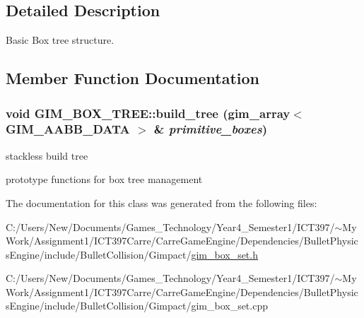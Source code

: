 \subsection{Detailed Description}
Basic Box tree structure. 

\subsection{Member Function Documentation}
\hypertarget{class_g_i_m___b_o_x___t_r_e_e_f76fa1d2f5e20c8979120fa72cf7575f}{
\subsubsection[build\_\-tree]{\setlength{\rightskip}{0pt plus 5cm}void GIM\_\-BOX\_\-TREE::build\_\-tree ({\bf gim\_\-array}$<$ GIM\_\-AABB\_\-DATA $>$ \& {\em primitive\_\-boxes})}}
\label{class_g_i_m___b_o_x___t_r_e_e_f76fa1d2f5e20c8979120fa72cf7575f}


stackless build tree 

prototype functions for box tree management 

The documentation for this class was generated from the following files:\begin{CompactItemize}
\item 
C:/Users/New/Documents/Games\_\-Technology/Year4\_\-Semester1/ICT397/$\sim$My Work/Assignment1/ICT397Carre/CarreGameEngine/Dependencies/BulletPhysicsEngine/include/BulletCollision/Gimpact/\hyperlink{gim__box__set_8h}{gim\_\-box\_\-set.h}\item 
C:/Users/New/Documents/Games\_\-Technology/Year4\_\-Semester1/ICT397/$\sim$My Work/Assignment1/ICT397Carre/CarreGameEngine/Dependencies/BulletPhysicsEngine/include/BulletCollision/Gimpact/gim\_\-box\_\-set.cpp\end{CompactItemize}
